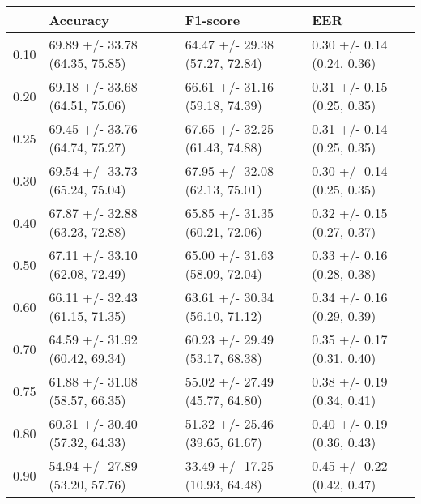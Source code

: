 \begin{tabular}{llll}
\toprule
{} &                        Accuracy &                        F1-score &                         EER \\
\midrule
0.10 &  69.89 +/- 33.78 (64.35, 75.85) &  64.47 +/- 29.38 (57.27, 72.84) &  0.30 +/- 0.14 (0.24, 0.36) \\
0.20 &  69.18 +/- 33.68 (64.51, 75.06) &  66.61 +/- 31.16 (59.18, 74.39) &  0.31 +/- 0.15 (0.25, 0.35) \\
0.25 &  69.45 +/- 33.76 (64.74, 75.27) &  67.65 +/- 32.25 (61.43, 74.88) &  0.31 +/- 0.14 (0.25, 0.35) \\
0.30 &  69.54 +/- 33.73 (65.24, 75.04) &  67.95 +/- 32.08 (62.13, 75.01) &  0.30 +/- 0.14 (0.25, 0.35) \\
0.40 &  67.87 +/- 32.88 (63.23, 72.88) &  65.85 +/- 31.35 (60.21, 72.06) &  0.32 +/- 0.15 (0.27, 0.37) \\
0.50 &  67.11 +/- 33.10 (62.08, 72.49) &  65.00 +/- 31.63 (58.09, 72.04) &  0.33 +/- 0.16 (0.28, 0.38) \\
0.60 &  66.11 +/- 32.43 (61.15, 71.35) &  63.61 +/- 30.34 (56.10, 71.12) &  0.34 +/- 0.16 (0.29, 0.39) \\
0.70 &  64.59 +/- 31.92 (60.42, 69.34) &  60.23 +/- 29.49 (53.17, 68.38) &  0.35 +/- 0.17 (0.31, 0.40) \\
0.75 &  61.88 +/- 31.08 (58.57, 66.35) &  55.02 +/- 27.49 (45.77, 64.80) &  0.38 +/- 0.19 (0.34, 0.41) \\
0.80 &  60.31 +/- 30.40 (57.32, 64.33) &  51.32 +/- 25.46 (39.65, 61.67) &  0.40 +/- 0.19 (0.36, 0.43) \\
0.90 &  54.94 +/- 27.89 (53.20, 57.76) &  33.49 +/- 17.25 (10.93, 64.48) &  0.45 +/- 0.22 (0.42, 0.47) \\
\bottomrule
\end{tabular}
